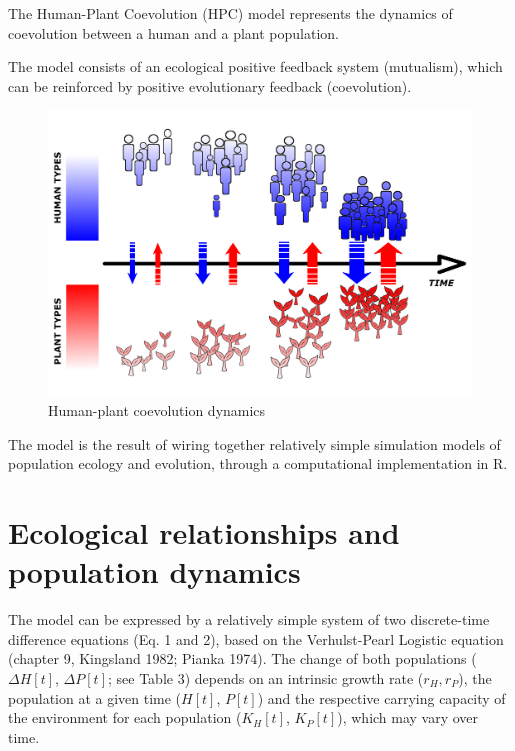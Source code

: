 \documentclass[
]{book}
\begin{document}
The Human-Plant Coevolution (HPC) model represents the dynamics of coevolution between a human and a plant population.

The model consists of an ecological positive feedback system (mutualism), which can be reinforced by positive evolutionary feedback (coevolution).

\begin{figure}

{\centering \includegraphics[width=0.8\linewidth]{images/infograph} 

}

\caption{Human-plant coevolution dynamics}\label{fig:infographic}
\end{figure}

The model is the result of wiring together relatively simple simulation models of population ecology and evolution, through a computational implementation in R.

\newpage

\hypertarget{ecological-relationships-and-population-dynamics}{%
\section*{Ecological relationships and population dynamics}\label{ecological-relationships-and-population-dynamics}}

The model can be expressed by a relatively simple system of two discrete-time difference equations (Eq. 1 and 2), based on the Verhulst-Pearl Logistic equation (chapter 9, Kingsland 1982; Pianka 1974). The change of both populations (\(\Delta H[t]\), \(\Delta P[t]\); see Table 3) depends on an intrinsic growth rate (\(r_{H}, r_{P}\)), the population at a given time (\(H[t]\), \(P[t]\)) and the respective carrying capacity of the environment for each population (\(K_{H}[t]\), \(K_{P}[t]\)), which may vary over time.
\end{document}
